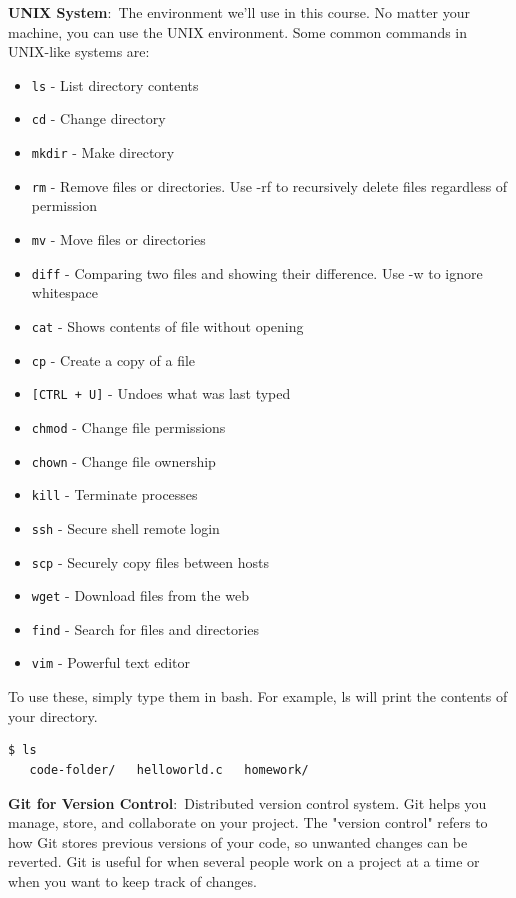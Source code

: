 \documentclass[nobib]{tufte-handout}
\newcommand{\defn}[2]{\noindent\textbf{#1}:\ #2}
\begin{document}
\defn{UNIX System}{The environment we'll use in this course.}
No matter your machine, you can use the UNIX environment. 
Some common commands in UNIX-like systems are:
\begin{itemize}
   \item \texttt{ls} - List directory contents
   \item \texttt{cd} - Change directory
   \item \texttt{mkdir} - Make directory
   \item \texttt{rm} - Remove files or directories. Use -rf to recursively delete files regardless of permission
   \item \texttt{mv} - Move files or directories
   \item \texttt{diff} - Comparing two files and showing their difference. Use -w to ignore whitespace
   \item \texttt{cat} - Shows contents of file without opening
   \item \texttt{cp} - Create a copy of a file
   \item \texttt{[CTRL + U]} - Undoes what was last typed
   \item \texttt{chmod} - Change file permissions
   \item \texttt{chown} - Change file ownership
   \item \texttt{kill} - Terminate processes
   \item \texttt{ssh} - Secure shell remote login
   \item \texttt{scp} - Securely copy files between hosts
   \item \texttt{wget} - Download files from the web
   \item \texttt{find} - Search for files and directories
   \item \texttt{vim} - Powerful text editor
\end{itemize}

\noindent To use these, simply type them in bash. For example, ls
will print the contents of your directory. 

\begin{lstlisting}[language=bash]
   $ ls
   code-folder/   helloworld.c   homework/
\end{lstlisting}

\defn{Git for Version Control}{Distributed version control system.} Git 
helps you manage, store, and collaborate on your project. The 
"version control" refers to how Git stores previous versions
of your code, so unwanted changes can be reverted. Git is useful
for when several people work on a project at a time or when you want
to keep track of changes.  
\end{document}
